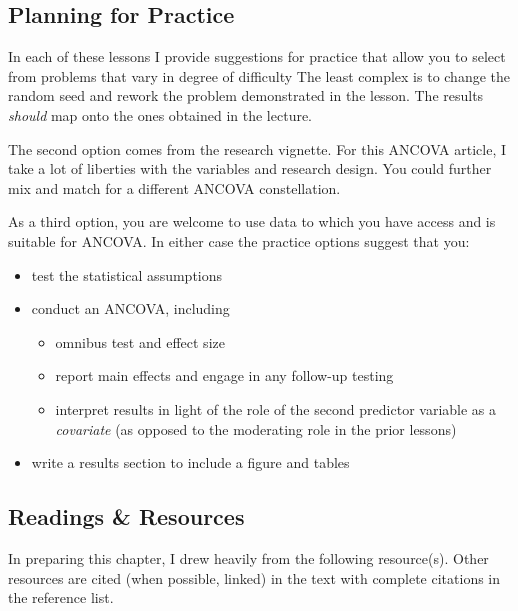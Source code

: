 \documentclass[
  11pt,
]{book}
\providecommand{\tightlist}{%
  \setlength{\itemsep}{0pt}\setlength{\parskip}{0pt}}
\begin{document}
\hypertarget{planning-for-practice-8}{%
\subsection{Planning for Practice}\label{planning-for-practice-8}}

In each of these lessons I provide suggestions for practice that allow you to select from problems that vary in degree of difficulty The least complex is to change the random seed and rework the problem demonstrated in the lesson. The results \emph{should} map onto the ones obtained in the lecture.

The second option comes from the research vignette. For this ANCOVA article, I take a lot of liberties with the variables and research design. You could further mix and match for a different ANCOVA constellation.

As a third option, you are welcome to use data to which you have access and is suitable for ANCOVA. In either case the practice options suggest that you:

\begin{itemize}
\tightlist
\item
  test the statistical assumptions
\item
  conduct an ANCOVA, including

  \begin{itemize}
  \tightlist
  \item
    omnibus test and effect size
  \item
    report main effects and engage in any follow-up testing
  \item
    interpret results in light of the role of the second predictor variable as a \emph{covariate} (as opposed to the moderating role in the prior lessons)
  \end{itemize}
\item
  write a results section to include a figure and tables
\end{itemize}

\hypertarget{readings-resources-8}{%
\subsection{Readings \& Resources}\label{readings-resources-8}}

In preparing this chapter, I drew heavily from the following resource(s). Other resources are cited (when possible, linked) in the text with complete citations in the reference list.
\end{document}
